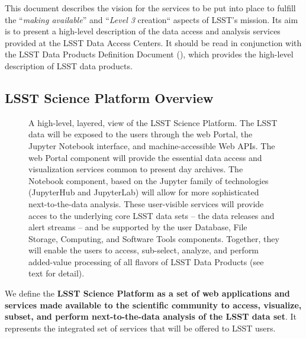 \documentclass[DM,lsstdraft,toc]{lsstdoc}
\begin{document}
This document describes the vision for the services to be put into place to
fulfill the ``{\em making available}'' and ``{\em Level 3} creation``
aspects of LSST's mission. Its aim is to present a high-level
description of the data access and analysis services provided at the
LSST Data Access Centers. It should be read in conjunction with the
LSST Data Products Definition Document (\DPDD), which provides the high-level
description of LSST data products.

\subsection{LSST Science Platform Overview}

\begin{figure}
\centering
{}
\caption{
A high-level, layered, view of the LSST Science Platform.  The LSST data
will be exposed to the users through the web Portal, the Jupyter Notebook
interface, and machine-accessible Web APIs.  The web Portal component will
provide the essential data access and visualization services common to
present day archives.  The Notebook component, based on the Jupyter family
of technologies (JupyterHub and JupyterLab) will allow for more
sophisticated next-to-the-data analysis.  These user-visible services will
provide acces to the underlying core LSST data sets -- the data releases and
alert streams -- and be supported by the user Database, File Storage,
Computing, and Software Tools components.  Together, they will enable the
users to access, sub-select, analyze, and perform added-value processing of
all flavors of LSST Data Products (see text for detail). 
\label{fig:layeredLSP}}
\end{figure}

We define the {\bf LSST Science Platform as a set of web applications and services
made available to the scientific community to access, visualize, subset, and
perform next-to-the-data analysis of the LSST data set}. It represents the integrated
set of services that will be offered to LSST users.
\end{document}
